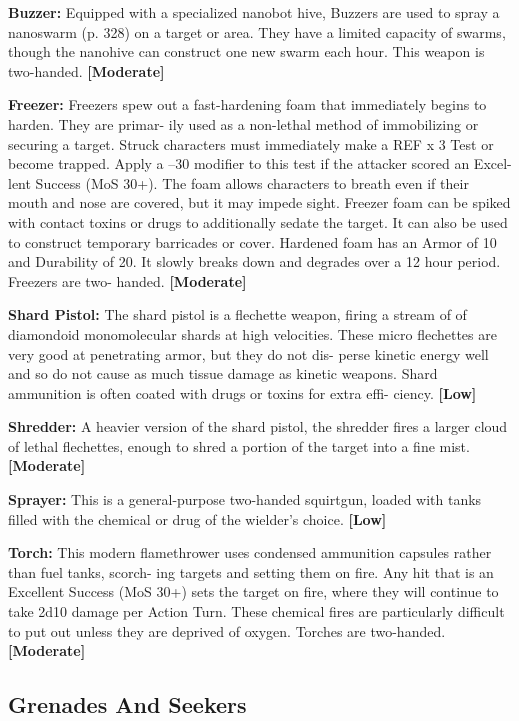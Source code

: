\textbf{Buzzer:} Equipped with a specialized nanobot hive, 
Buzzers are used to spray a nanoswarm (p. 328) on a 
target or area. They have a limited capacity of swarms, 
though the nanohive can construct one new swarm 
each hour. This weapon is two-handed. \textbf{[Moderate]}

\textbf{Freezer:} Freezers spew out a fast-hardening foam 
that immediately begins to harden. They are primar-
ily used as a non-lethal method of immobilizing or 
securing a target. Struck characters must immediately 
make a REF x 3 Test or become trapped. Apply a –30 
modifier to this test if the attacker scored an Excel-
lent Success (MoS 30+). The foam allows characters 
to breath even if their mouth and nose are covered, 
but it may impede sight. Freezer foam can be spiked 
with contact toxins or drugs to additionally sedate 
the target. It can also be used to construct temporary 
barricades or cover. Hardened foam has an Armor of 
10 and Durability of 20. It slowly breaks down and 
degrades over a 12 hour period. Freezers are two-
handed. \textbf{[Moderate]}

\textbf{Shard Pistol:} The shard pistol is a flechette weapon, 
firing a stream of of diamondoid monomolecular 
shards at high velocities. These micro flechettes are 
very good at penetrating armor, but they do not dis-
perse kinetic energy well and so do not cause as much 
tissue damage as kinetic weapons. Shard ammunition 
is often coated with drugs or toxins for extra effi-
ciency. \textbf{[Low]}

\textbf{Shredder:} A heavier version of the shard pistol, 
the shredder fires a larger cloud of lethal flechettes, 
enough to shred a portion of the target into a fine 
mist. \textbf{[Moderate]}

\textbf{Sprayer:} This is a general-purpose two-handed 
squirtgun, loaded with tanks filled with the chemical 
or drug of the wielder's choice. \textbf{[Low]}

\textbf{Torch:} This modern flamethrower uses condensed 
ammunition capsules rather than fuel tanks, scorch-
ing targets and setting them on fire. Any hit that is 
an Excellent Success (MoS 30+) sets the target on 
fire, where they will continue to take 2d10 damage 
per Action Turn. These chemical fires are particularly 
difficult to put out unless they are deprived of oxygen. 
Torches are two-handed. \textbf{[Moderate]}

\subsection{Grenades And Seekers}


